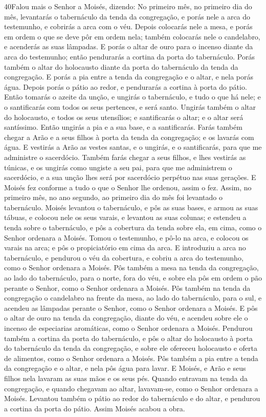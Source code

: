 \medskip

\lettrine{40} Falou mais o Senhor a Moisés, dizendo: No
primeiro mês, no primeiro dia do mês, levantarás o tabernáculo da
tenda da congregação, e porás nele a arca do testemunho, e
cobrirás a arca com o véu. Depois colocarás nele a mesa, e porás
em ordem o que se deve pôr em ordem nela; também colocarás nele o
candelabro, e acenderás as suas lâmpadas. E porás o altar de
ouro para o incenso diante da arca do testemunho; então pendurarás a
cortina da porta do tabernáculo. Porás também o altar do
holocausto diante da porta do tabernáculo da tenda da congregação.
E porás a pia entre a tenda da congregação e o altar, e nela
porás água. Depois porás o pátio ao redor, e pendurarás a
cortina à porta do pátio. Então tomarás o azeite da unção, e
ungirás o tabernáculo, e tudo o que há nele; e o santificarás com
todos os seus pertences, e será santo. Ungirás também o altar
do holocausto, e todos os seus utensílios; e santificarás o altar; e
o altar será santíssimo. Então ungirás a pia e a sua base, e
a santificarás. Farás também chegar a Arão e a seus filhos à
porta da tenda da congregação; e os lavarás com água. E
vestirás a Arão as vestes santas, e o ungirás, e o santificarás,
para que me administre o sacerdócio. Também farás chegar a
seus filhos, e lhes vestirás as túnicas, e os ungirás como
ungiste a seu pai, para que me administrem o sacerdócio, e a sua
unção lhes será por sacerdócio perpétuo nas suas gerações. E
Moisés fez conforme a tudo o que o Senhor lhe ordenou, assim o fez.
Assim, no primeiro mês, no ano segundo, ao primeiro dia do
mês foi levantado o tabernáculo. Moisés levantou o
tabernáculo, e pôs as suas bases, e armou as suas tábuas, e colocou
nele os seus varais, e levantou as suas colunas; e estendeu a
tenda sobre o tabernáculo, e pôs a cobertura da tenda sobre ela, em
cima, como o Senhor ordenara a Moisés. Tomou o testemunho, e
pô-lo na arca, e colocou os varais na arca; e pôs o propiciatório em
cima da arca. E introduziu a arca no tabernáculo, e pendurou
o véu da cobertura, e cobriu a arca do testemunho, como o Senhor
ordenara a Moisés. Pôs também a mesa na tenda da congregação,
ao lado do tabernáculo, para o norte, fora do véu, e sobre
ela pôs em ordem o pão perante o Senhor, como o Senhor ordenara a
Moisés. Pôs também na tenda da congregação o candelabro na
frente da mesa, ao lado do tabernáculo, para o sul, e acendeu
as lâmpadas perante o Senhor, como o Senhor ordenara a Moisés.
E pôs o altar de ouro na tenda da congregação, diante do véu,
e acendeu sobre ele o incenso de especiarias aromáticas, como
o Senhor ordenara a Moisés. Pendurou também a cortina da
porta do tabernáculo, e pôs o altar do holocausto à porta do
tabernáculo da tenda da congregação, e sobre ele ofereceu holocausto
e oferta de alimentos, como o Senhor ordenara a Moisés. Pôs
também a pia entre a tenda da congregação e o altar, e nela pôs água
para lavar. E Moisés, e Arão e seus filhos nela lavaram as
suas mãos e os seus pés. Quando entravam na tenda da
congregação, e quando chegavam ao altar, lavavam-se, como o Senhor
ordenara a Moisés. Levantou também o pátio ao redor do
tabernáculo e do altar, e pendurou a cortina da porta do pátio.
Assim Moisés acabou a obra.

